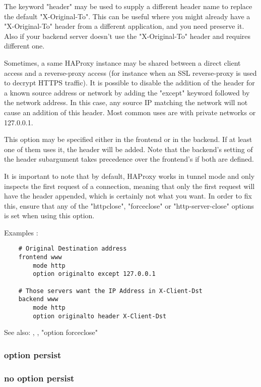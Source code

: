   The keyword "header" may be used to supply a different header name to replace
  the default "X-Original-To". This can be useful where you might already
  have a "X-Original-To" header from a different application, and you need
  preserve it. Also if your backend server doesn't use the "X-Original-To"
  header and requires different one.

  Sometimes, a same HAProxy instance may be shared between a direct client
  access and a reverse-proxy access (for instance when an SSL reverse-proxy is
  used to decrypt HTTPS traffic). It is possible to disable the addition of the
  header for a known source address or network by adding the "except" keyword
  followed by the network address. In this case, any source IP matching the
  network will not cause an addition of this header. Most common uses are with
  private networks or 127.0.0.1.

  This option may be specified either in the frontend or in the backend. If at
  least one of them uses it, the header will be added. Note that the backend's
  setting of the header subargument takes precedence over the frontend's if
  both are defined.

  It is important to note that by default, HAProxy works in tunnel mode and
  only inspects the first request of a connection, meaning that only the first
  request will have the header appended, which is certainly not what you want.
  In order to fix this, ensure that any of the "httpclose", "forceclose" or
  "http-server-close" options is set when using this option.

  Examples :
\begin{verbatim}
    # Original Destination address
    frontend www
        mode http
        option originalto except 127.0.0.1

    # Those servers want the IP Address in X-Client-Dst
    backend www
        mode http
        option originalto header X-Client-Dst
\end{verbatim}

  See also: , ,
             "option forceclose"

\subsubsection[option persist]{option persist}
\subsubsection[no option persist]{no option persist}

